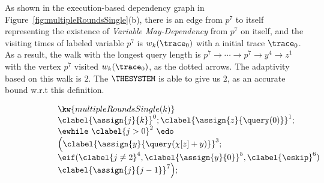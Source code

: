 \begin{example}
    As shown in the execution-based dependency graph in Figure~\ref{fig:multipleRoundsSingle}(b), 
    there is an edge from $p^7$ to itself representing the existence of \emph{Variable May-Dependency} from $p^7$ on itself,
    and the visiting times of labeled variable $p^7$ is 
    $w_k(\trace_0)$ with a initial trace $\trace_0$. 
    As a result, the walk with the longest query length 
    is
    $p^7  \to \cdots \to p^7 \to y^4  \to z^1 $ with the vertex $p^7$ visited $w_k(\trace_0)$,
    as the dotted arrows. 
    The adaptivity 
    based on
    this walk
    is $2$.
    The $\THESYSTEM$ is able to give us $2$,  as an accurate bound w.r.t this definition.
        \begin{figure}
     \centering
    \quad
    \begin{subfigure}{.35\textwidth}
    \begin{centering}
    $
        \begin{array}{l}
            \kw{multipleRoundsSingle(k)}\\
               \clabel{ \assign{j}{k}}^{0} ; 
                \clabel{\assign{z}{\query(0)} }^{1} ;   \\          
                \ewhile ~ \clabel{j > 0}^{2} ~ \edo ~ \\
                \Big(
                 \clabel{\assign{y}{\query(\chi[z]+y)} }^{3}  ; \\
              \eif(\clabel{ j \neq 2}^{4}, 
              \clabel{ \assign{y}{0}}^{5} ,\clabel{\eskip}^{6})\\
              \clabel{\assign{j}{j - 1}}^{7}
         \Big);\\
            \end{array}
    $
    \caption{}
    \end{centering}
    \end{subfigure}
    \begin{subfigure}{.6\textwidth}
        \begin{centering}
\end{centering}
\end{subfigure}
\end{figure}
\end{example}

